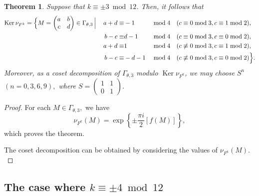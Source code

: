 \documentclass[12pt]{article}
\theoremstyle{definition}
\newtheorem{theorem}{Theorem}
\numberwithin{equation}{section}
\numberwithin{theorem}{section}
\newcommand{\Ker}{\operatorname{Ker}}
\begin{document}
\begin{theorem}
\label{thmk=3-level3}
{\it
Suppose that 
$k\equiv \pm 3 \bmod{12}$. 
Then, it follows that 
\begin{align*}
\Ker \nu_{F^{k}}
=
\Big\{
M=
\begin{pmatrix}
a & b \\
c & d
\end{pmatrix}
\in
\Gamma_{\theta,3} \,\Big| \, 
&  &a+d \equiv& -1 &  &\bmod{4}  &  &(c\equiv 0 \bmod{3}, c\equiv 1 \bmod{2}),  \\
&  &b-c \equiv& d-1&  &\bmod{4}  & &(c\equiv 0 \bmod{3}, c \equiv 0 \bmod{2}), \\
\vspace{2mm}
&  &a+d \equiv& 1 &  &\bmod{4}  &  &(c \not\equiv 0 \bmod{3}, c \equiv 1 \bmod{2}),   \\
&  &b-c \equiv& -d-1 &  &\bmod{4} & &(c\not\equiv 0 \bmod{3}, c\equiv 0 \bmod{2})
\Big\}.
\end{align*}
Moreover, 
as a coset decomposition of $\Gamma_{\theta,3}$ modulo $\Ker \nu_{F^{k}}$,  
we may choose $S^{n}$ $(n=0,3,6,9),$ where 
$
S=
\begin{pmatrix}
1 & 1 \\
0 & 1
\end{pmatrix}. 
$
}
\end{theorem}




\begin{proof}
For each $M\in\Gamma_{\theta,3},$ 
we have 
\begin{equation*}
\nu_{F^k}(M)=
\exp
\left\{
\pm
\frac{\pi i}{2}
\left[
f(M)
\right]
\right\},
\end{equation*}
which proves the theorem. 
\par
The coset decomposition can be obtained by considering the values of $\nu_{F^{k}  }(M).$
\end{proof}



















\subsection{The case where $k\equiv \pm 4 \bmod{12}$}
\end{document}
